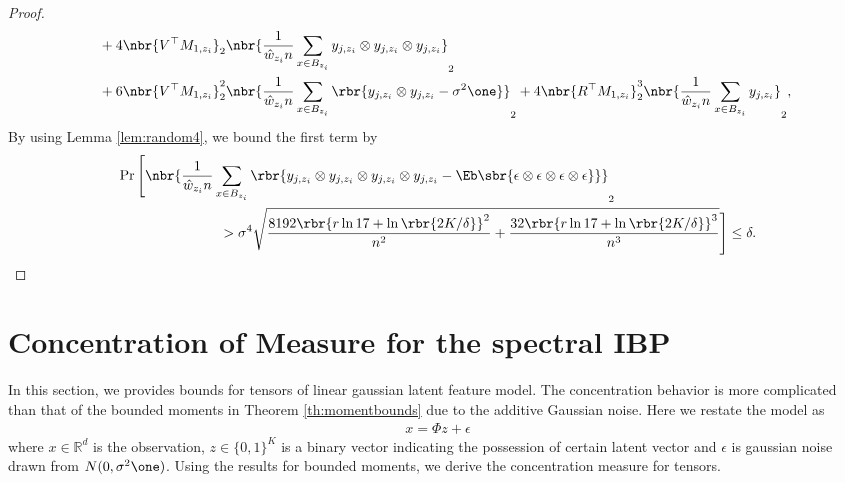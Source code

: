 \documentclass[twoside,11pt]{article}
\begin{document}
{\begin{proof}
\begin{align*}
    &\,\,\,\,\,\,+ 4 \nbr{V^\top M_{1,z_i} }_2 \nbr{  \frac{1}{\hat{w}_{z_i}n} \sum \limits_{x \in B_{z_i}}  y_{j,z_i}\otimes y_{j,z_i}\otimes y_{j,z_i} }_2\\
    &\,\,\,\,\,\,+ 6 \nbr{V^\top M_{1,z_i} }_2^2  \nbr{  \frac{1}{\hat{w}_{z_i}n} \sum \limits_{x \in B_{z_i}} \rbr{ y_{j,z_i}\otimes y_{j,z_i} -  \sigma^2\one}  }_2+ 4 \nbr{R^\top M_{1,z_i} }_2^3 \nbr{  \frac{1}{\hat{w}_{z_i}n} \sum \limits_{x \in B_{z_i}}  y_{j,z_i} }_2,
  \end{align*}
 By using Lemma \ref{lem:random4}, we bound the first term by
  \begin{align}
    \Pr \Bigg[ &\nbr{ \frac{1}{\hat{w}_{z_i}n} \sum \limits_{x \in B_{z_i}} \rbr{ y_{j,z_i}\otimes y_{j,z_i}\otimes y_{j,z_i}\otimes y_{j,z_i}  -  \Eb \sbr{\epsilon \otimes \epsilon \otimes \epsilon \otimes \epsilon }  } }_2\nonumber \\
    & \,\,\,\,\,\,\,\,\,\,\,\,\,\, \,\,\,\,\,\,\,\,\,\,\,\,\,\,\,\,\,\, > \sigma^4 \sqrt{\frac{8192 \rbr{r\ln 17 +\ln \rbr{2K/\delta}}^2 }{n^2}  +\frac{32\rbr{r\ln 17 +\ln \rbr{2K/\delta}}^3 }{n^3} }  \Bigg] \leq \delta.
  \end{align}
\end{proof}

\section{Concentration of Measure for the spectral IBP}
In this section, we provides bounds for tensors of linear gaussian latent feature model. The concentration behavior is more complicated than that of the bounded moments in Theorem \ref{th:momentbounds} due to the additive Gaussian noise. Here we restate the model as
  \begin{align}
    x= \Phi z + \epsilon 
  \end{align}
where $x \in \mathbb{R}^d$ is the observation, $z \in \{0,1\}^K$ is a binary vector indicating the possession of certain latent vector and $\epsilon$ is gaussian noise drawn from $N(0, \sigma^2 \one)$. Using the results for bounded moments, we derive the concentration measure for tensors.


}
\end{document}
